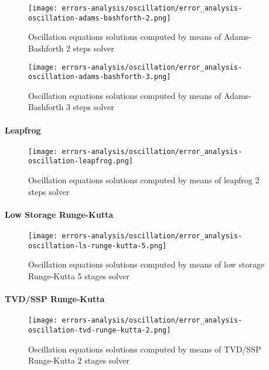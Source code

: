 \documentclass[pdftex,preprint,3p,times,numbers]{elsarticle}
\begin{document}
\begin{figure}[!ht]
  \centering
  \texttt{[image: errors-analysis/oscillation/error\_analysis-oscillation-adams-bashforth-2.png]}
  \caption{Oscillation equations solutions computed by means of Adams-Bashforth 2 steps solver}\label{fig:results-oscillation-adams-bashforth-2}
\end{figure}

\begin{figure}[!ht]
  \centering
  \texttt{[image: errors-analysis/oscillation/error\_analysis-oscillation-adams-bashforth-3.png]}
  \caption{Oscillation equations solutions computed by means of Adams-Bashforth 3 steps solver}\label{fig:results-oscillation-adams-bashforth-3}
\end{figure}

\paragraph{Leapfrog}

\begin{figure}[!ht]
  \centering
  \texttt{[image: errors-analysis/oscillation/error\_analysis-oscillation-leapfrog.png]}
  \caption{Oscillation equations solutions computed by means of leapfrog 2 steps solver}\label{fig:results-oscillation-leapfrog}
\end{figure}

\paragraph{Low Storage Runge-Kutta}

\begin{figure}[!ht]
  \centering
  \texttt{[image: errors-analysis/oscillation/error\_analysis-oscillation-ls-runge-kutta-5.png]}
  \caption{Oscillation equations solutions computed by means of low storage Runge-Kutta 5 stages solver}\label{fig:results-oscillation-ls-runge-kutta-5}
\end{figure}

\paragraph{TVD/SSP Runge-Kutta}

\begin{figure}[!ht]
  \centering
  \texttt{[image: errors-analysis/oscillation/error\_analysis-oscillation-tvd-runge-kutta-2.png]}
  \caption{Oscillation equations solutions computed by means of TVD/SSP Runge-Kutta 2 stages solver}\label{fig:results-oscillation-tvd-runge-kutta-2}
\end{figure}
\end{document}
